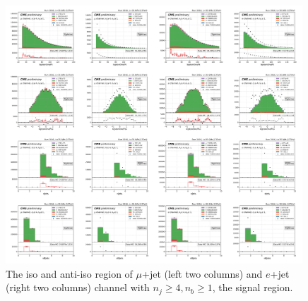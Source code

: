 \begin{figure}
    \centering
    \includegraphics[width=0.99\textwidth]{chapters/Appendix/sectionQCD/figures/ijets_iso_antiiso_QCDmc.png}
    
    
    
    

    \caption{The iso and anti-iso region of $\mu$+jet (left two columns) and $e$+jet (right two columns) channel 
    with $n_j\geq4,n_b\geq1$, the signal region.}
    \label{fig:appendix:4j1b}
\end{figure}




